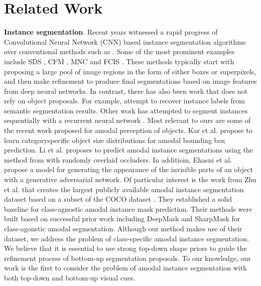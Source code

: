 \documentclass[10pt,twocolumn,letterpaper]{article}
\begin{document}
\section{Related Work}
 \textbf{Instance segmentation}. Recent years witnessed a rapid progress of Convolutional Neural 
Network (CNN) based instance segmentation algorithms over conventional methods such as \cite{he2014exemplar}. 
Some of the most prominent examples include SDS \cite{hariharan2014simultaneous,hariharan2015hypercolumns,li2016iterative}, CFM \cite{dai2015convolutional}, MNC \cite{dai2016instance} and FCIS \cite{li2017fully}. 
These methods typically start with proposing a large pool of image regions in the form 
of either boxes or superpixels, and then make refinement to produce final segmentations
based on image features from deep neural networks. In contrast, there has also been work 
that does not rely on object proposals. For example, \cite{bai2017deep,Liang2015proposal,uhrig2016pixel} attempt to recover instance 
labels from semantic segmentation results. Other work has attempted to segment instances 
sequentially with a recurrent neural network \cite{romera2016recurrent}. Most relevant to ours are some of the 
recent work proposed for amodal perception of objects. Kar et al. \cite{kar2015amodal} propose to learn category\-specific
object size distributions for amodal bounding box prediction. Li et al.\cite{li2016amodal} proposes to predict amodal instance segmentations using the method from \cite{li2016iterative} with randomly overlaid occluders. In additioin, Ehasni et al. \cite{ehsani2017segan} propose a model for generating the appearance of the invisible parts of an object with a generative adversarial network. Of particular interest is the work from Zhu et al. \cite{premachandran2015pascal} that creates the largest publicly available amodal instance segmentation dataset based on a subset of the COCO dataset \cite{lin2014microsoft}. They established a solid baseline for class-agnostic amodal instance mask prediction. Their methods were built based on successful prior work including DeepMask \cite{pinheiro2015learning} and SharpMask \cite{pinheiro2016learning} for class-agonstic amodal segmentation. Although our method makes use of their dataset, we address the problem of class-speciﬁc amodal instance segmentation. We believe that it is essential to use strong top-down shape priors to guide the reﬁnement process of bottom-up segmentation proposals. To our knowledge, our work is the ﬁrst to consider the problem of amodal instance segmentation with both top-down and bottom-up visual cues.
\end{document}
